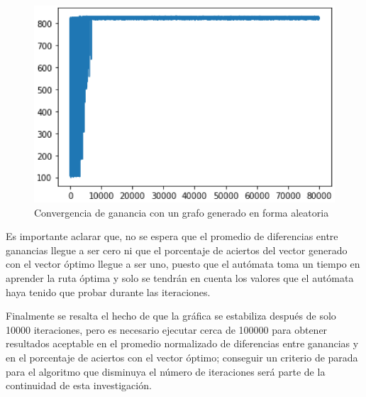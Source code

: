 \begin{figure}[h]
	\centering
	\includegraphics[scale=0.64]{GanGrafoRandom.png}
	\caption{Convergencia de ganancia con un grafo generado en forma aleatoria}
	\label{Gangraforandom}
\end{figure}

Es importante aclarar que, no se espera que el promedio de diferencias entre ganancias llegue a ser cero ni que el porcentaje de aciertos del vector generado con el vector óptimo llegue a ser uno, puesto que el autómata toma un tiempo en aprender la ruta óptima y solo se tendrán en cuenta los valores que el autómata haya tenido que probar durante las iteraciones. 

Finalmente se resalta el hecho de que la gráfica se estabiliza después de solo 10000 iteraciones, pero es necesario ejecutar cerca de 100000 para obtener resultados aceptable en el promedio normalizado de diferencias entre ganancias y en el porcentaje de aciertos con el vector óptimo; conseguir un criterio de parada para el algoritmo que disminuya el número de iteraciones será parte de la continuidad de esta investigación.